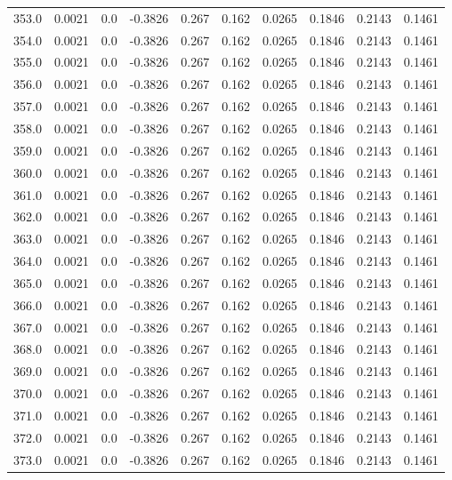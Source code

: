 \begin{longtable}{lrrrrrrrrr}
353.0 & 0.0021 & 0.0 & -0.3826 & 0.267 & 0.162 & 0.0265 & 0.1846 & 0.2143 & 0.1461 \\
354.0 & 0.0021 & 0.0 & -0.3826 & 0.267 & 0.162 & 0.0265 & 0.1846 & 0.2143 & 0.1461 \\
355.0 & 0.0021 & 0.0 & -0.3826 & 0.267 & 0.162 & 0.0265 & 0.1846 & 0.2143 & 0.1461 \\
356.0 & 0.0021 & 0.0 & -0.3826 & 0.267 & 0.162 & 0.0265 & 0.1846 & 0.2143 & 0.1461 \\
357.0 & 0.0021 & 0.0 & -0.3826 & 0.267 & 0.162 & 0.0265 & 0.1846 & 0.2143 & 0.1461 \\
358.0 & 0.0021 & 0.0 & -0.3826 & 0.267 & 0.162 & 0.0265 & 0.1846 & 0.2143 & 0.1461 \\
359.0 & 0.0021 & 0.0 & -0.3826 & 0.267 & 0.162 & 0.0265 & 0.1846 & 0.2143 & 0.1461 \\
360.0 & 0.0021 & 0.0 & -0.3826 & 0.267 & 0.162 & 0.0265 & 0.1846 & 0.2143 & 0.1461 \\
361.0 & 0.0021 & 0.0 & -0.3826 & 0.267 & 0.162 & 0.0265 & 0.1846 & 0.2143 & 0.1461 \\
362.0 & 0.0021 & 0.0 & -0.3826 & 0.267 & 0.162 & 0.0265 & 0.1846 & 0.2143 & 0.1461 \\
363.0 & 0.0021 & 0.0 & -0.3826 & 0.267 & 0.162 & 0.0265 & 0.1846 & 0.2143 & 0.1461 \\
364.0 & 0.0021 & 0.0 & -0.3826 & 0.267 & 0.162 & 0.0265 & 0.1846 & 0.2143 & 0.1461 \\
365.0 & 0.0021 & 0.0 & -0.3826 & 0.267 & 0.162 & 0.0265 & 0.1846 & 0.2143 & 0.1461 \\
366.0 & 0.0021 & 0.0 & -0.3826 & 0.267 & 0.162 & 0.0265 & 0.1846 & 0.2143 & 0.1461 \\
367.0 & 0.0021 & 0.0 & -0.3826 & 0.267 & 0.162 & 0.0265 & 0.1846 & 0.2143 & 0.1461 \\
368.0 & 0.0021 & 0.0 & -0.3826 & 0.267 & 0.162 & 0.0265 & 0.1846 & 0.2143 & 0.1461 \\
369.0 & 0.0021 & 0.0 & -0.3826 & 0.267 & 0.162 & 0.0265 & 0.1846 & 0.2143 & 0.1461 \\
370.0 & 0.0021 & 0.0 & -0.3826 & 0.267 & 0.162 & 0.0265 & 0.1846 & 0.2143 & 0.1461 \\
371.0 & 0.0021 & 0.0 & -0.3826 & 0.267 & 0.162 & 0.0265 & 0.1846 & 0.2143 & 0.1461 \\
372.0 & 0.0021 & 0.0 & -0.3826 & 0.267 & 0.162 & 0.0265 & 0.1846 & 0.2143 & 0.1461 \\
373.0 & 0.0021 & 0.0 & -0.3826 & 0.267 & 0.162 & 0.0265 & 0.1846 & 0.2143 & 0.1461 \\

\end{longtable}
